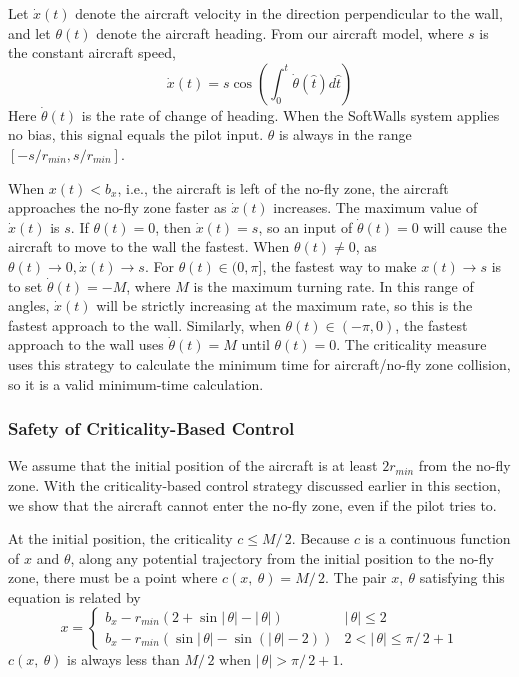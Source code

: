 \documentclass[11pt]{article}
\begin{document}
Let $\dot{x}(t)$ denote the aircraft velocity in the direction
perpendicular to the wall, and let $\theta(t)$ denote the aircraft
heading.  From our aircraft model, where $s$ is the constant aircraft
speed,
\[
\dot{x}(t) = s \cos{(\int_{0}^{t}{\dot{\theta}}(\hat{t})d\hat{t})}
\]
Here $\dot{\theta}(t)$ is the rate of change of heading.  When the
SoftWalls system applies no bias, this signal equals the pilot input.
$\theta$ is always in the range $[-s / r_{min}, s / r_{min}]$.

When $x(t) < b_{x}$, i.e., the aircraft is left of the no-fly zone,
the aircraft approaches the no-fly zone faster as $\dot{x}(t)$
increases.  The maximum value of $\dot{x}(t)$ is $s$.  If $\theta(t) =
0$, then $\dot{x}(t) = s$, so an input of $\dot{\theta}(t) = 0$ will
cause the aircraft to move to the wall the fastest.  When $\theta(t)
\neq 0$, as $\theta(t) \rightarrow 0, \dot{x}(t) \rightarrow s$.  For
$\theta(t) \in (0,\pi]$, the fastest way to make $x(t) \rightarrow s$
is to set $\dot{\theta}(t) = -M$, where $M$ is the maximum turning
rate.  In this range of angles, $\dot{x}(t)$ will be strictly
increasing at the maximum rate, so this is the fastest approach to the
wall.  Similarly, when $\theta(t) \in (-\pi, 0)$, the fastest approach
to the wall uses $\dot{\theta}(t) = M$ until $\theta(t) = 0$.  The
criticality measure uses this strategy to calculate the minimum time
for aircraft/no-fly zone collision, so it is a valid minimum-time
calculation.

\subsubsection{Safety of Criticality-Based Control}

We assume that the initial position of the aircraft is at least
$2r_{min}$ from the no-fly zone. With the criticality-based control
strategy discussed earlier in this section, we show that the aircraft
cannot enter the no-fly zone, even if the pilot tries to.

At the initial position, the criticality $c \leq M/\,2$. Because $c$ is a
continuous function of $x$ and $\theta$, along any potential trajectory from
the initial position to the no-fly zone, there must be a point where
$c(x,\ \theta) = M/\,2$. The pair $x,\ \theta$ satisfying this equation is
related by
\[x = 
\left\{ \begin{array}{ll}
b_x - r_{min}(2 + \sin\!|\,\theta| - |\,\theta|) & |\,\theta| \leq 2 
\\
b_x - r_{min}(\sin\!|\,\theta| - \sin(|\,\theta|-2)) & 2 < |\,\theta| \leq \pi/\,2 + 1
\end{array}
\right.
\]
$c(x,\ \theta)$ is always less than $M/\,2$ when $|\,\theta| > \pi/\,2 + 1$.
\end{document}
